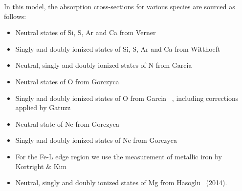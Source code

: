 			In this model, the absorption cross-sections for various species are sourced as follows:
			\begin{itemize}
				\item Neutral states of Si, S, Ar and Ca from Verner \etal\ \cite{vernerXS}
				\item Singly and doubly ionized states of Si, S, Ar and Ca from Witthoeft \etal\ \cite{witthoeftXS1,witthoeftXS2}
				\item Neutral, singly and doubly ionized states of N from Garcia \etal\ \cite{garciaXS1}
				\item Neutral states of O from Gorczyca \etal\ \cite{gorczycaXS1}
				\item Singly and doubly ionized states of O from Garcia \etal\ \cite{garciaXS2}, including corrections applied by Gatuzz \etal\ \cite{gatuzzXS}
				\item Neutral state of Ne from Gorczyca \etal\ \cite{gorczycaXS2}
				\item Singly and doubly ionized states of Ne from Gorczyca \etal\ \cite{gorczycaXS3}
				\item For the Fe-L edge region we use the measurement of metallic iron by Kortright \& Kim \cite{kortrightXS}
				\item Neutral, singly and doubly ionized states of Mg from Hasoglu \etal\ (2014).
			\end{itemize}
			
